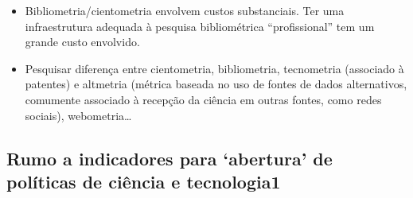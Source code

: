 \documentclass[11pt]{article}
\begin{document}
\begin{itemize}
\item Bibliometria/cientometria envolvem custos substanciais. Ter uma infraestrutura adequada à pesquisa bibliométrica ``profissional'' tem um grande custo envolvido.

\item Pesquisar diferença entre cientometria, bibliometria, tecnometria (associado à patentes) e altmetria (métrica baseada no uso  de fontes de dados alternativos, comumente associado à recepção da ciência em outras fontes, como redes sociais), webometria\ldots{}
\end{itemize}

\subsection{Rumo a indicadores para ‘abertura’ de políticas de ciência e tecnologia1}
\label{sec:orgcfe4140}
\end{document}
